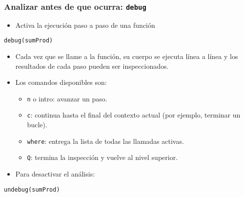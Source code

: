 \documentclass[xcolor={usenames,svgnames,dvipsnames}]{beamer}
\begin{document}
\begin{frame}[fragile]
\frametitle{Analizar antes de que ocurra: \texttt{debug}}
\label{sec-3-2}

\begin{itemize}
\item Activa la ejecución paso a paso de una función
\end{itemize}

\lstset{language=R}
\begin{lstlisting}
debug(sumProd)
\end{lstlisting}


\begin{itemize}
\item Cada vez que se llame a la función, su cuerpo se ejecuta línea a línea y los resultados de cada paso pueden ser inspeccionados.
\item Los comandos disponibles son:
\begin{itemize}
\item \texttt{n} o intro: avanzar un paso.
\item \texttt{c}: continua hasta el final del contexto actual (por ejemplo,
    terminar un bucle).
\item \texttt{where}: entrega la lista de todas las llamadas activas.
\item \texttt{Q}: termina la inspección y vuelve al nivel superior.
\end{itemize}
\item Para desactivar el análisis:
\end{itemize}

\lstset{language=R}
\begin{lstlisting}
undebug(sumProd)
\end{lstlisting}
\end{frame}
\end{document}
